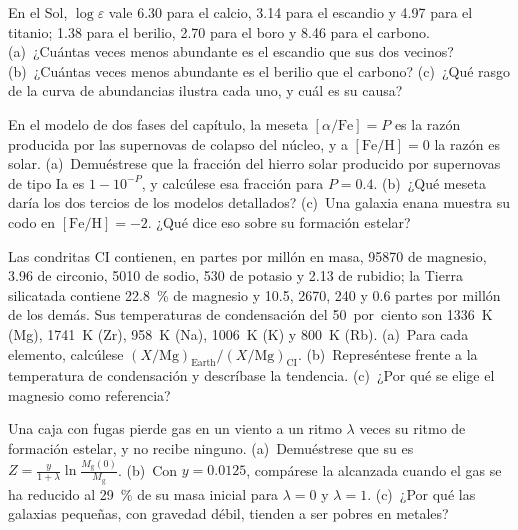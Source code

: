 \begin{exercise}[$\star\star$]\label{exo:b3:origin-of-elements:8}
En el Sol, $\log\varepsilon$ vale \num{6.30} para el calcio, \num{3.14} para
el escandio y \num{4.97} para el titanio; \num{1.38} para el berilio,
\num{2.70} para el boro y \num{8.46} para el carbono. (a)~¿Cuántas veces menos abundante es
el escandio que sus dos vecinos? (b)~¿Cuántas veces menos abundante es
el berilio que el carbono? (c)~¿Qué rasgo de la curva de abundancias ilustra
cada uno, y cuál es su causa?
\end{exercise}

\begin{exercise}[$\star\star$]\label{exo:b3:origin-of-elements:9}
En el modelo de dos fases del capítulo, la meseta
$[\alpha/\mathrm{Fe}] = P$ es la razón producida por las supernovas de colapso del núcleo,
y a $[\mathrm{Fe/H}] = 0$ la razón es solar. (a)~Demuéstrese que la fracción
del hierro solar producido por supernovas de tipo Ia es $1 - 10^{-P}$, y calcúlese
esa fracción para $P = 0.4$. (b)~¿Qué meseta daría los dos tercios de
los modelos detallados? (c)~Una galaxia enana muestra su codo en
$[\mathrm{Fe/H}] = -2$. ¿Qué dice eso sobre su formación estelar?
\end{exercise}

\begin{exercise}[$\star\star\star$]\label{exo:b3:origin-of-elements:10}
Las condritas CI contienen, en partes por millón en masa, \num{95870}
de magnesio, \num{3.96} de circonio, \num{5010} de sodio, \num{530}
de potasio y \num{2.13} de rubidio; la Tierra silicatada contiene
\qty{22.8}{\percent} de magnesio y \num{10.5}, \num{2670}, \num{240}
y \num{0.6} partes por millón de los demás. Sus temperaturas de condensación del 50~por~ciento
son \qty{1336}{K} (Mg), \qty{1741}{K} (Zr),
\qty{958}{K} (Na), \qty{1006}{K} (K) y \qty{800}{K} (Rb). (a)~Para
cada elemento, calcúlese $(X/\mathrm{Mg})_\mathrm{Earth}/(X/\mathrm{Mg})_\mathrm{CI}$.
(b)~Represéntese frente a la temperatura de condensación y descríbase la
tendencia. (c)~¿Por qué se elige el magnesio como referencia?
\end{exercise}

\begin{exercise}[$\star\star\star$]\label{exo:b3:origin-of-elements:11}
Una caja con fugas pierde gas en un viento a un ritmo $\lambda$ veces su ritmo de
formación estelar, y no recibe ninguno. (a)~Demuéstrese que su  es
$Z = \frac{y}{1 + \lambda}\ln\frac{M_\mathrm{g}(0)}{M_\mathrm{g}}$.
(b)~Con $y = 0.0125$, compárese la  alcanzada cuando el gas se ha
reducido al \qty{29}{\percent} de su masa inicial para $\lambda = 0$ y
$\lambda = 1$. (c)~¿Por qué las galaxias pequeñas, con gravedad débil, tienden a ser
pobres en metales?
\end{exercise}


